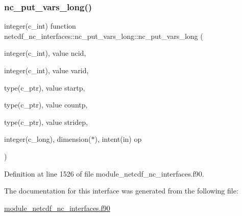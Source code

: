 \subsubsection{\texorpdfstring{nc\+\_\+put\+\_\+vars\+\_\+long()}{nc\_put\_vars\_long()}}
{\footnotesize\ttfamily integer(c\+\_\+int) function netcdf\+\_\+nc\+\_\+interfaces\+::nc\+\_\+put\+\_\+vars\+\_\+long\+::nc\+\_\+put\+\_\+vars\+\_\+long (\begin{DoxyParamCaption}\item[{integer(c\+\_\+int), value}]{ncid,  }\item[{integer(c\+\_\+int), value}]{varid,  }\item[{type(c\+\_\+ptr), value}]{startp,  }\item[{type(c\+\_\+ptr), value}]{countp,  }\item[{type(c\+\_\+ptr), value}]{stridep,  }\item[{integer(c\+\_\+long), dimension($\ast$), intent(in)}]{op }\end{DoxyParamCaption})}



Definition at line 1526 of file module\+\_\+netcdf\+\_\+nc\+\_\+interfaces.\+f90.



The documentation for this interface was generated from the following file\+:\begin{DoxyCompactItemize}
\item 
\hyperlink{module__netcdf__nc__interfaces_8f90}{module\+\_\+netcdf\+\_\+nc\+\_\+interfaces.\+f90}\end{DoxyCompactItemize}
